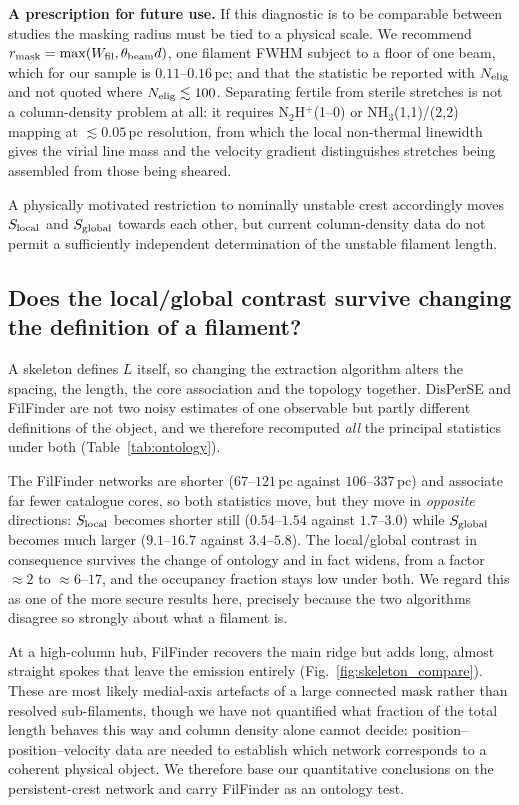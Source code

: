 \documentclass[usenatbib,twoside,twocolumn]{mnras}
\begin{document}
\smallskip\noindent\textbf{A prescription for future use.} If this diagnostic is to be comparable between studies the masking radius must be tied to a physical scale. We recommend $r_{\rm mask}=\max(W_{\rm fil},\theta_{\rm beam}d)$, one filament FWHM subject to a floor of one beam, which for our sample is $0.11$--$0.16$\,pc; and that the statistic be reported with $N_{\rm elig}$ and not quoted where $N_{\rm elig}\lesssim100$. Separating fertile from sterile stretches is not a column-density problem at all: it requires N$_2$H$^+$(1--0) or NH$_3$(1,1)/(2,2) mapping at $\lesssim0.05$\,pc resolution, from which the local non-thermal linewidth gives the virial line mass and the velocity gradient distinguishes stretches being assembled from those being sheared.

A physically motivated restriction to nominally unstable crest accordingly moves $S_{\rm local}$ and $S_{\rm global}$ towards each other, but current column-density data do not permit a sufficiently independent determination of the unstable filament length.



\subsection{Does the local/global contrast survive changing the definition of a filament?}
\label{sec:ontology}

A skeleton defines $L$ itself, so changing the extraction algorithm alters the spacing, the length, the core association and the topology together. DisPerSE and FilFinder are not two noisy estimates of one observable but partly different definitions of the object, and we therefore recomputed \emph{all} the principal statistics under both (Table~\ref{tab:ontology}).

The FilFinder networks are shorter ($67$--$121$\,pc against $106$--$337$\,pc) and associate far fewer catalogue cores, so both statistics move, but they move in \emph{opposite} directions: $S_{\rm local}$ becomes shorter still ($0.54$--$1.54$ against $1.7$--$3.0$) while $S_{\rm global}$ becomes much larger ($9.1$--$16.7$ against $3.4$--$5.8$). The local/global contrast in consequence survives the change of ontology and in fact widens, from a factor $\approx2$ to $\approx6$--$17$, and the occupancy fraction stays low under both. We regard this as one of the more secure results here, precisely because the two algorithms disagree so strongly about what a filament is.

At a high-column hub, FilFinder recovers the main ridge but adds long, almost straight spokes that leave the emission entirely (Fig.~\ref{fig:skeleton_compare}). These are most likely medial-axis artefacts of a large connected mask rather than resolved sub-filaments, though we have not quantified what fraction of the total length behaves this way and column density alone cannot decide: position--position--velocity data are needed to establish which network corresponds to a coherent physical object. We therefore base our quantitative conclusions on the persistent-crest network and carry FilFinder as an ontology test.
\end{document}
